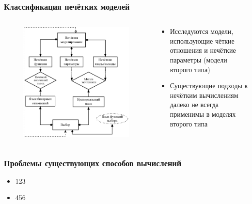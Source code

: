 \documentclass[12pt]{beamer}
\begin{document}
\begin{frame}
  \frametitle{Классификация нечётких моделей}
  \begin{columns}[onlytextwidth]
    \begin{column}{0.6\textwidth}
      \begin{figure}[h]
        \includegraphics[width=\textwidth]{choice-classification}
      \end{figure}
    \end{column}
    \begin{column}{0.4\textwidth}
      \begin{itemize}
        \item Исследуются модели, использующие чёткие отношения и нечёткие параметры (модели второго типа)
        \item Существующие подходы к нечётким вычислениям далеко не всегда применимы в моделях второго типа
      \end{itemize}
    \end{column}
  \end{columns}
\end{frame}

\begin{frame}
  \frametitle{Проблемы существующих способов вычислений}
  \begin{itemize}
    \item 123
    \item 456
  \end{itemize}
\end{frame}
\end{document}
